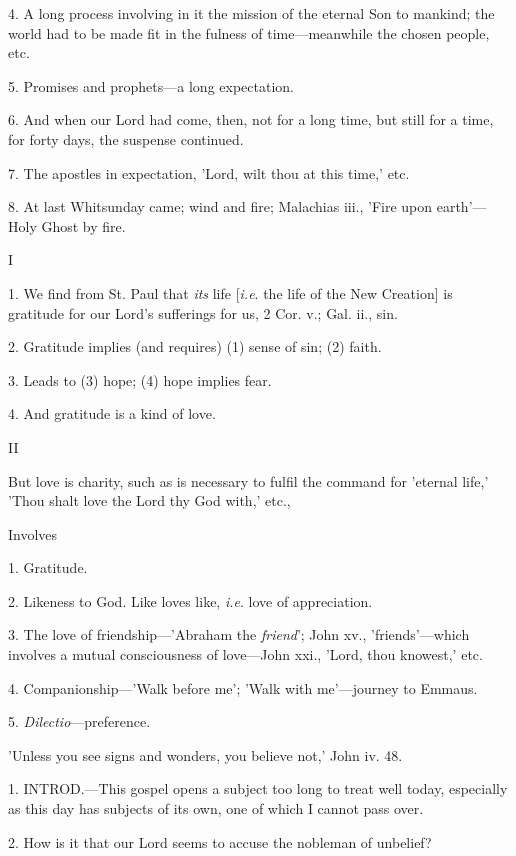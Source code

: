 4. A long process involving in it the mission of
the eternal Son to mankind; the world had to be made fit in the
fulness of time—meanwhile the chosen people, etc.

5. Promises and prophets—a long expectation.

6. And when our Lord had come, then, not for a
long time, but still for a time, for forty days, the suspense
continued.

7. The apostles in expectation, 'Lord, wilt thou
at this time,' etc.

8. At last Whitsunday came; wind and fire;
Malachias iii., 'Fire upon earth'—Holy Ghost by fire.


I

1. We find from St. Paul that \emph{its} life [\emph{i.e}.
the life of the New Creation] is gratitude for our Lord's sufferings
for us, 2 Cor. v.; Gal. ii., sin.

2. Gratitude implies (and requires) (1) sense of
sin; (2) faith.

3. Leads to (3) hope; (4) hope implies fear.

4. And gratitude is a kind of love.

II

But love is charity, such as is necessary to
fulfil the command for 'eternal life,' 'Thou shalt love the Lord thy
God with,' etc.,

Involves

1. Gratitude.

2. Likeness to God. Like loves like, \emph{i.e}.
love of appreciation.

3. The love of friendship—'Abraham the \emph{friend}';
John xv., 'friends'—which involves a mutual consciousness of
love—John xxi., 'Lord, thou knowest,' etc.

4. Companionship—'Walk before me'; 'Walk with
me'—journey to Emmaus.

5. \emph{Dilectio}—preference.


'Unless you see signs and wonders, you believe
not,' John iv. 48.

1. INTROD.—This
gospel opens a subject too long to treat well today, especially as
this day has subjects of its own, one of which I cannot pass over.

2. How is it that our Lord seems to accuse the
nobleman of unbelief?

